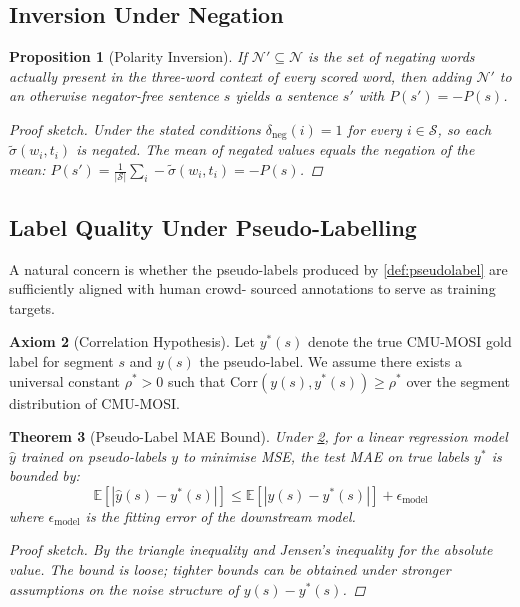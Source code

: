 \documentclass[12pt,a4paper]{article}
\theoremstyle{plain}
\newtheorem{theorem}{Theorem}[section]
\newtheorem{proposition}[theorem]{Proposition}
\theoremstyle{definition}
\newtheorem{axiom}[theorem]{Axiom}
\begin{document}
\subsection{Inversion Under Negation}

\begin{proposition}[Polarity Inversion]
\label{prop:inversion}
  If $\mathcal{N}' \subseteq \mathcal{N}$ is the set of negating
  words actually present in the three-word context of every scored
  word, then adding $\mathcal{N}'$ to an otherwise negator-free
  sentence $s$ yields a sentence $s'$ with
  $P(s') = -P(s)$.
  \begin{proof}[Proof sketch]
    Under the stated conditions $\delta_{\text{neg}}(i) = 1$ for
    every $i \in \mathcal{S}$, so each $\tilde{\sigma}(w_i,t_i)$
    is negated.  The mean of negated values equals the negation of
    the mean: $P(s') = \frac{1}{|\mathcal{S}|}\sum_i
    -\tilde{\sigma}(w_i,t_i) = -P(s)$.
  \end{proof}
\end{proposition}

\subsection{Label Quality Under Pseudo-Labelling}

A natural concern is whether the pseudo-labels produced by
\cref{def:pseudolabel} are sufficiently aligned with human crowd-
sourced annotations to serve as training targets.

\begin{axiom}[Correlation Hypothesis]
\label{ax:corr}
  Let $y^*(s)$ denote the true CMU-MOSI gold label for segment $s$
  and $y(s)$ the pseudo-label.  We assume there exists a universal
  constant $\rho^* > 0$ such that
  $\text{Corr}(y(s), y^*(s)) \ge \rho^*$ over the segment
  distribution of CMU-MOSI.
\end{axiom}

\begin{theorem}[Pseudo-Label MAE Bound]
\label{thm:mae_bound}
  Under \cref{ax:corr}, for a linear regression model $\hat{y}$
  trained on pseudo-labels $y$ to minimise MSE, the test MAE on
  true labels $y^*$ is bounded by:
  \[
    \mathbb{E}[|\hat{y}(s) - y^*(s)|]
    \le
    \mathbb{E}[|y(s) - y^*(s)|] + \epsilon_\text{model}
  \]
  where $\epsilon_\text{model}$ is the fitting error of the
  downstream model.
  \begin{proof}[Proof sketch]
    By the triangle inequality and Jensen's inequality for the
    absolute value.  The bound is loose; tighter bounds can be
    obtained under stronger assumptions on the noise structure of
    $y(s) - y^*(s)$.
  \end{proof}
\end{theorem}
\end{document}
